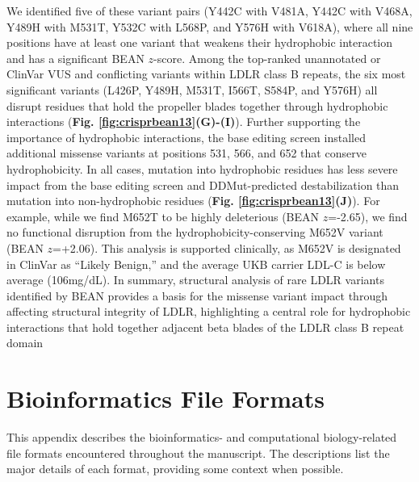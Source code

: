 \documentclass[a4paper, titlepage, openright]{book}
\begin{document}
We identified five of these variant pairs (Y442C with V481A, Y442C with V468A, Y489H with M531T, Y532C with L568P, and Y576H with V618A), where all nine positions have at least one variant that weakens their hydrophobic interaction and has a significant BEAN $z$-score. Among the top-ranked unannotated or ClinVar VUS and conflicting variants within LDLR class B repeats, the six most significant variants (L426P, Y489H, M531T, I566T, S584P, and Y576H) all disrupt residues that hold the propeller blades together through hydrophobic interactions (\textbf{Fig. \ref{fig:crisprbean13}(G)-(I)}). Further supporting the importance of hydrophobic interactions, the base editing screen installed additional missense variants at positions 531, 566, and 652 that conserve hydrophobicity. In all cases, mutation into hydrophobic residues has less severe impact from the base editing screen and DDMut-predicted destabilization than mutation into non-hydrophobic residues (\textbf{Fig. \ref{fig:crisprbean13}(J)}). For example, while we find M652T to be highly deleterious (BEAN $z$=-2.65), we find no functional disruption from the hydrophobicity-conserving M652V variant (BEAN $z$=+2.06). This analysis is supported clinically, as M652V is designated in ClinVar as “Likely Benign,” and the average UKB carrier LDL-C is below average (106mg/dL). In summary, structural analysis of rare LDLR variants identified by BEAN provides a basis for the missense variant impact through affecting structural integrity of LDLR, highlighting a central role for hydrophobic interactions that hold together adjacent beta blades of the LDLR class B repeat domain


\appendix
\chapter{Bioinformatics File Formats}\label{appendix:fileformats}
This appendix describes the bioinformatics- and computational biology-related file formats encountered throughout the manuscript. The descriptions list the major details of each format, providing some context when possible. 

\end{document}
